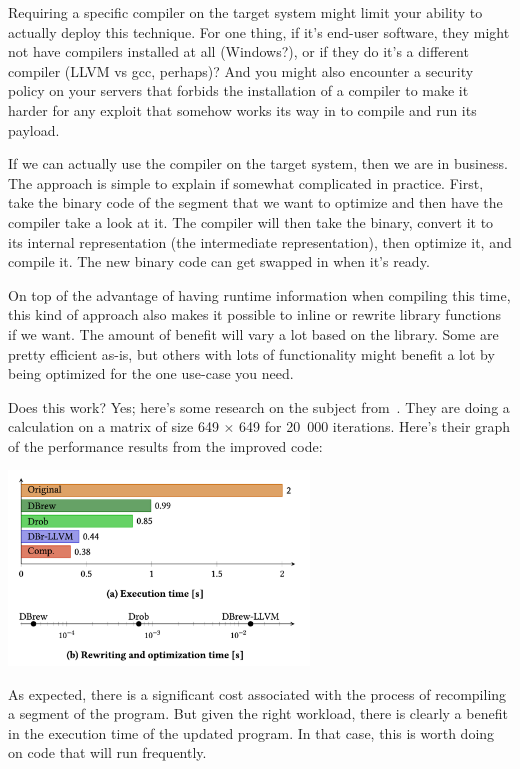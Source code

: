 \documentclass[a4paper]{report}
\begin{document}
Requiring a specific compiler on the target system might limit your ability to actually deploy this technique. For one thing, if it's end-user software, they might not have compilers installed at all (Windows?), or if they do it's a different compiler (LLVM vs gcc, perhaps)? And you might also encounter a security policy on your servers that forbids the installation of a compiler to make it harder for any exploit that somehow works its way in to compile and run its payload.

If we can actually use the compiler on the target system, then we are in business. The approach is simple to explain if somewhat complicated in practice. First, take the binary code of the segment that we want to optimize and then have the compiler take a look at it. The compiler will then take the binary, convert it to its internal representation (the intermediate representation), then optimize it, and compile it. The new binary code can get swapped in when it's ready.

On top of the advantage of having runtime information when compiling this time, this kind of approach also makes it possible to inline or rewrite library functions if we want. The amount of benefit will vary a lot based on the library. Some are pretty efficient as-is, but others with lots of functionality might benefit a lot by being optimized for the one use-case you need.

Does this work? Yes; here's some research on the subject from~\cite{binaryrewriting}. They are doing a calculation on a matrix of size 649 $\times$ 649 for 20~000 iterations. Here's their graph of the performance results from the improved code:

\begin{center}
	\includegraphics[width=0.6\textwidth]{images/rewriting.png}
\end{center}

As expected, there is a significant cost associated with the process of recompiling a segment of the program. But given the right workload, there is clearly a benefit in the execution time of the updated program. In that case, this is worth doing on code that will run frequently.
\end{document}
